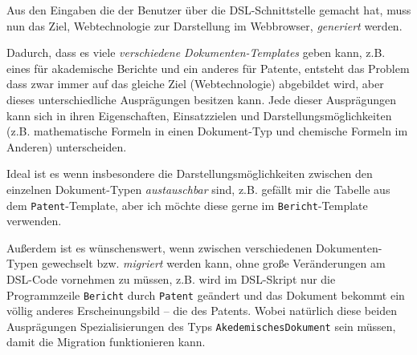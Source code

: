 Aus den Eingaben die der Benutzer über die DSL-Schnittstelle gemacht hat,
muss nun das Ziel, Webtechnologie zur Darstellung im
Webbrowser, \emph{generiert} werden.

Dadurch, dass es viele \emph{verschiedene Dokumenten-Templates} geben kann,
z.B. eines für akademische Berichte und ein anderes für Patente, entsteht das
Problem dass zwar immer auf das gleiche Ziel (Webtechnologie) abgebildet
wird, aber dieses unterschiedliche Ausprägungen besitzen kann. Jede
dieser Ausprägungen kann sich in ihren Eigenschaften, Einsatzzielen
und Darstellungsmöglichkeiten (z.B. mathematische Formeln in einen
Dokument-Typ und chemische Formeln im Anderen) unterscheiden.

Ideal ist es wenn insbesondere die Darstellungsmöglichkeiten zwischen
den einzelnen Dokument-Typen \emph{austauschbar} sind, z.B. gefällt mir
die Tabelle aus dem \verb|Patent|-Template, aber ich möchte diese gerne im
\verb|Bericht|-Template verwenden.

Außerdem ist
es wünschenswert, wenn zwischen verschiedenen Dokumenten-Typen gewechselt
bzw. \emph{migriert} werden kann, ohne große Veränderungen am
DSL-Code vornehmen zu müssen, z.B. wird im
DSL-Skript nur die Programmzeile \verb|Bericht| durch \verb|Patent| geändert und
das Dokument bekommt ein völlig anderes Erscheinungsbild -- die des Patents.
Wobei natürlich diese beiden Ausprägungen Spezialisierungen des Typs
\verb|AkedemischesDokument| sein müssen, damit die Migration funktionieren kann.

